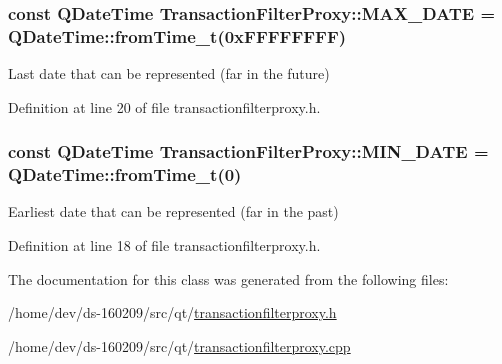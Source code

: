 \subsubsection[{M\+A\+X\+\_\+\+D\+A\+T\+E}]{\setlength{\rightskip}{0pt plus 5cm}const Q\+Date\+Time Transaction\+Filter\+Proxy\+::\+M\+A\+X\+\_\+\+D\+A\+T\+E = Q\+Date\+Time\+::from\+Time\+\_\+t(0x\+F\+F\+F\+F\+F\+F\+F\+F)\hspace{0.3cm}{\ttfamily [static]}}\label{class_transaction_filter_proxy_a5ac7f4d41a56e44f4cc74ebeffb5a254}
Last date that can be represented (far in the future) 

Definition at line 20 of file transactionfilterproxy.\+h.

\hypertarget{class_transaction_filter_proxy_aac7bf4c1105641b19eb6f7c8741b502e}{}
\subsubsection[{M\+I\+N\+\_\+\+D\+A\+T\+E}]{\setlength{\rightskip}{0pt plus 5cm}const Q\+Date\+Time Transaction\+Filter\+Proxy\+::\+M\+I\+N\+\_\+\+D\+A\+T\+E = Q\+Date\+Time\+::from\+Time\+\_\+t(0)\hspace{0.3cm}{\ttfamily [static]}}\label{class_transaction_filter_proxy_aac7bf4c1105641b19eb6f7c8741b502e}
Earliest date that can be represented (far in the past) 

Definition at line 18 of file transactionfilterproxy.\+h.



The documentation for this class was generated from the following files\+:\begin{DoxyCompactItemize}
\item 
/home/dev/ds-\/160209/src/qt/\hyperlink{transactionfilterproxy_8h}{transactionfilterproxy.\+h}\item 
/home/dev/ds-\/160209/src/qt/\hyperlink{transactionfilterproxy_8cpp}{transactionfilterproxy.\+cpp}\end{DoxyCompactItemize}
